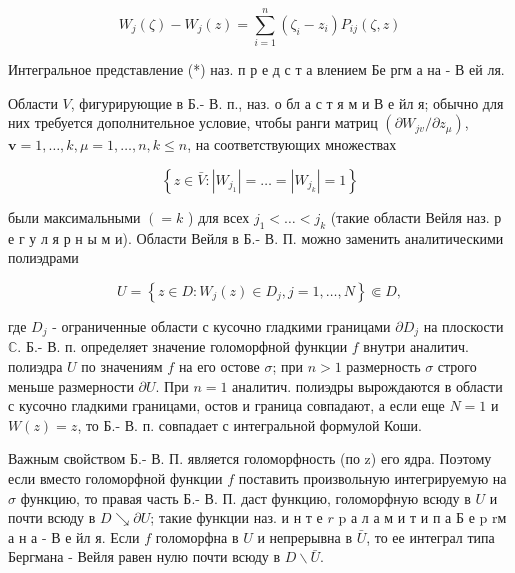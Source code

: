 \documentclass[10pt]{article}
\begin{document}
\[

W_{j}(\zeta)-W_{j}(z)=\sum_{i=1}^{n}\left(\zeta_{i}-z_{i}\right) P_{i j}(\zeta, z)

\]



Интегральное представление (*) наз. п р е д с т а влением Бе ргм а на - В ей ля.



Области $V$, фигурирующие в Б.- В. п., наз. о бл а с т я м и В е йл я; обычно для них требуется дополнительное условие, чтобы ранги матриц $\left(\partial W_{j v} / \partial z_{\mu}\right)$, $\boldsymbol{v}=1, \ldots, k, \mu=1, \ldots, n, k \leqslant n$, на соответствующих множествах



\[

\left\{z \in \bar{V}:\left|W_{j_{1}}\right|=\ldots=\left|W_{j_{k}}\right|=1\right\}

\]



были максимальными $\left(=k\right.$ ) для всех $j_{1}<\ldots<j_{k}$ (такие области Вейля наз. р е г у л я р н ы м и). Области Вейля в Б.- В. П. можно заменить аналитическими полиэдрами



\[

U=\left\{z \in D: W_{j}(z) \in D_{j}, j=1, \ldots, N\right\} \Subset D,

\]



где $D_{j}$ - ограниченные области с кусочно гладкими границами $\partial D_{j}$ на плоскости $\mathbb{C}$. Б.- В. п. определяет значение голоморфной функции $f$ внутри аналитич. полиэдра $U$ по значениям $f$ на его остове $\sigma$; при $n>1$ размерность $\sigma$ строго меньше размерности $\partial U$. При $n=1$ аналитич. полиэдры вырождаются в области с кусочно гладкими границами, остов и граница совпадают, а если еще $N=1$ и $W(z)=z$, то Б.- В. п. совпадает с интегральной формулой Коши.



Важным свойством Б.- В. П. является голоморфность (по z) его ядра. Поэтому если вместо голоморфной функции $f$ поставить произвольную интегрируемую на $\sigma$ функцию, то правая часть Б.- В. П. даст функцию, голоморфную всюду в $U$ и почти всюду в $D \searrow \partial U$; такие функции наз. и н т е $r$ p а л а м и т и п а Б е p rм а н а - В е йл я. Если $f$ голоморфна в $U$ и непрерывна в $\bar{U}$, то ее интеграл типа Бергмана - Вейля равен нулю почти всюду в $D \backslash \bar{U}$.
\end{document}
